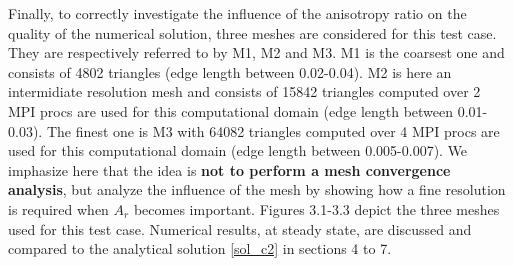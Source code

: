 Finally, to correctly investigate the influence of the anisotropy ratio on the quality of the numerical solution, three meshes are considered for this test case. They are respectively referred to by M1, M2 and M3. M1 is the coarsest one and consists of 4802 triangles (edge length between 0.02-0.04). M2 is here an intermidiate resolution mesh and consists of 15842 triangles computed over 2 MPI procs are used for this computational domain (edge length between 0.01-0.03). The finest one is M3 with 64082 triangles computed over 4 MPI procs are used for this computational domain (edge length between 0.005-0.007). We imphasize here that the idea is \textbf{not to perform a mesh convergence analysis}, but analyze the influence of the mesh by showing how a fine resolution is required when $A_r$ becomes important. Figures 3.1-3.3 depict the three meshes used for this test case. Numerical results, at steady state, are discussed and compared to the analytical solution \eqref{sol_c2} in sections 4 to 7.


